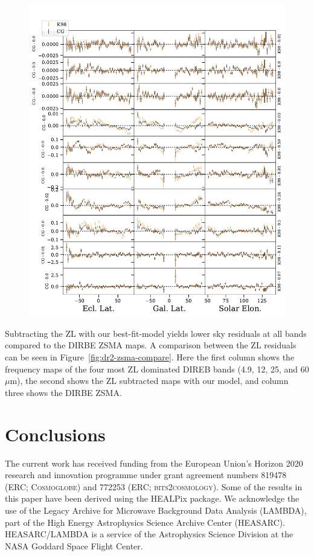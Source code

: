 \documentclass[twocolumn]{aa}
\begin{document}
\begin{figure}
    \centering
    \includegraphics[width=\linewidth]{figs/tod_zodi_residuals.pdf}
    \caption{}
    \label{fig:res_vs_b}
\end{figure}


Subtracting the ZL with our best-fit-model yields lower sky residuals at all bands 
compared to the DIRBE ZSMA maps. A comparison between the ZL residuals can be seen 
in Figure~\ref{fig:dr2-zsma-compare}. Here the first column shows the frequency maps of the
four most ZL dominated DIREB bands (4.9, 12, 25, and 60 $\mu$m), the second shows the ZL
subtracted maps with our model, and column three shows the DIRBE ZSMA.




\section{Conclusions}
\label{sec:conclusions}


\begin{acknowledgements}
 The current work has received funding from the European
  Union’s Horizon 2020 research and innovation programme under grant
  agreement numbers 819478 (ERC; \textsc{Cosmoglobe}) and 772253 (ERC;
  \textsc{bits2cosmology}). Some of the results in this paper have been 
  derived using the HEALPix \citep{Gorski2005} package.
  We acknowledge the use of the Legacy Archive for Microwave Background 
  Data
  Analysis (LAMBDA), part of the High Energy Astrophysics Science
  Archive Center
  (HEASARC). HEASARC/LAMBDA is a service of the Astrophysics Science 
  Division at the NASA Goddard Space Flight Center.  
\end{acknowledgements}
\end{document}
